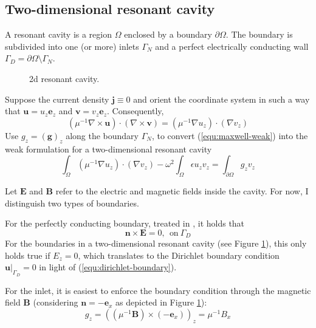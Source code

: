 \documentclass[11pt, a4paper]{article}
\begin{document}
\subsection{Two-dimensional resonant cavity}
\label{subsec:cavity}

A resonant cavity is a region $\Omega$ enclosed by a boundary $\partial \Omega$.
The boundary is subdivided into one (or more) inlets $\Gamma_N$ and a perfect
electrically conducting wall $\Gamma_D = \partial \Omega \setminus \Gamma_N$.

\begin{figure}[h]
    \centering
    
    \caption{2d resonant cavity.}
    \label{fig:2d-cavity}
\end{figure}

Suppose the current density $\mathbf{j} \equiv 0$ and orient the coordinate
system in such a way that $\mathbf{u} = u_z \mathbf{e}_z$ and 
$\mathbf{v} = v_z \mathbf{e}_z$. Consequently,
\begin{equation}
    (\mu^{-1} \nabla \times \mathbf{u}) \cdot (\nabla \times \mathbf{v})
    = (\mu^{-1} \nabla u_z) \cdot (\nabla v_z)
\end{equation}
Use $g_z = (\mathbf{g})_z$ along the boundary $\Gamma_N$,
to convert (\ref{equ:maxwell-weak}) into
the weak formulation for a two-dimensional resonant cavity
\begin{equation}
    \int_{\Omega} (\mu^{-1} \nabla u_z) \cdot (\nabla v_z)
    - \omega^2 \int_{\Omega} \epsilon u_z v_z
    = \int_{\partial \Omega} g_z v_z \label{equ:maxwell-weak-resonant-cavity}
\end{equation}

Let $\mathbf{E}$ and $\mathbf{B}$ refer to the electric and magnetic fields inside
the cavity. For now, I distinguish two types of boundaries.

For the perfectly conducting boundary, treated in \citep{monk}, it holds that
\begin{equation}
    \mathbf{n} \times \mathbf{E} = 0,~~\text{on}~\Gamma_D
\end{equation}
For the boundaries in a two-dimensional resonant cavity (see Figure 
\ref{fig:2d-cavity}), this only holds true if $E_z = 0$, which translates
to the Dirichlet boundary condition $\left.\mathbf{u}\right|_{\Gamma_D} = 0$
in light of (\ref{equ:dirichlet-boundary}).

For the inlet, it is easiest to enforce the boundary condition through the
magnetic field $\mathbf{B}$ (considering $\mathbf{n} = -\mathbf{e}_x$ as
depicted in Figure \ref{fig:2d-cavity}):
\begin{equation}
    g_z = (({\mu^{-1} \mathbf{B}}) \times (-\mathbf{e}_x))_z = \mu^{-1} B_x
\end{equation}
\end{document}
